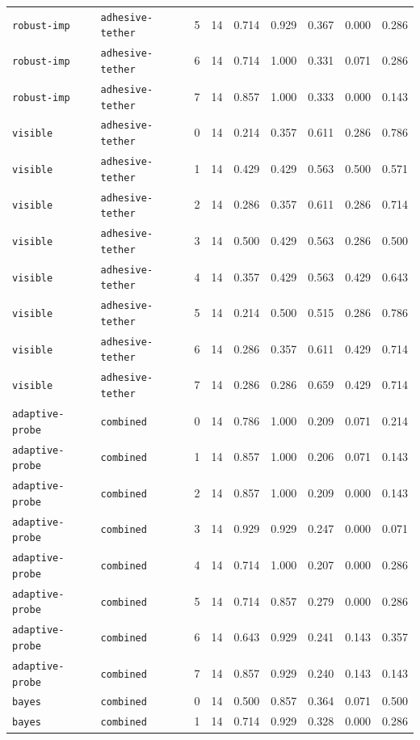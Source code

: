 \documentclass{article}
\begin{document}
\begin{center}
{\begin{tabular}{llllccccc}
\texttt{robust-imp} & \texttt{adhesive-tether} & 5 & 14 & 0.714 & 0.929 & 0.367 & 0.000 & 0.286 \\
\texttt{robust-imp} & \texttt{adhesive-tether} & 6 & 14 & 0.714 & 1.000 & 0.331 & 0.071 & 0.286 \\
\texttt{robust-imp} & \texttt{adhesive-tether} & 7 & 14 & 0.857 & 1.000 & 0.333 & 0.000 & 0.143 \\
\texttt{visible} & \texttt{adhesive-tether} & 0 & 14 & 0.214 & 0.357 & 0.611 & 0.286 & 0.786 \\
\texttt{visible} & \texttt{adhesive-tether} & 1 & 14 & 0.429 & 0.429 & 0.563 & 0.500 & 0.571 \\
\texttt{visible} & \texttt{adhesive-tether} & 2 & 14 & 0.286 & 0.357 & 0.611 & 0.286 & 0.714 \\
\texttt{visible} & \texttt{adhesive-tether} & 3 & 14 & 0.500 & 0.429 & 0.563 & 0.286 & 0.500 \\
\texttt{visible} & \texttt{adhesive-tether} & 4 & 14 & 0.357 & 0.429 & 0.563 & 0.429 & 0.643 \\
\texttt{visible} & \texttt{adhesive-tether} & 5 & 14 & 0.214 & 0.500 & 0.515 & 0.286 & 0.786 \\
\texttt{visible} & \texttt{adhesive-tether} & 6 & 14 & 0.286 & 0.357 & 0.611 & 0.429 & 0.714 \\
\texttt{visible} & \texttt{adhesive-tether} & 7 & 14 & 0.286 & 0.286 & 0.659 & 0.429 & 0.714 \\
\texttt{adaptive-probe} & \texttt{combined} & 0 & 14 & 0.786 & 1.000 & 0.209 & 0.071 & 0.214 \\
\texttt{adaptive-probe} & \texttt{combined} & 1 & 14 & 0.857 & 1.000 & 0.206 & 0.071 & 0.143 \\
\texttt{adaptive-probe} & \texttt{combined} & 2 & 14 & 0.857 & 1.000 & 0.209 & 0.000 & 0.143 \\
\texttt{adaptive-probe} & \texttt{combined} & 3 & 14 & 0.929 & 0.929 & 0.247 & 0.000 & 0.071 \\
\texttt{adaptive-probe} & \texttt{combined} & 4 & 14 & 0.714 & 1.000 & 0.207 & 0.000 & 0.286 \\
\texttt{adaptive-probe} & \texttt{combined} & 5 & 14 & 0.714 & 0.857 & 0.279 & 0.000 & 0.286 \\
\texttt{adaptive-probe} & \texttt{combined} & 6 & 14 & 0.643 & 0.929 & 0.241 & 0.143 & 0.357 \\
\texttt{adaptive-probe} & \texttt{combined} & 7 & 14 & 0.857 & 0.929 & 0.240 & 0.143 & 0.143 \\
\texttt{bayes} & \texttt{combined} & 0 & 14 & 0.500 & 0.857 & 0.364 & 0.071 & 0.500 \\
\texttt{bayes} & \texttt{combined} & 1 & 14 & 0.714 & 0.929 & 0.328 & 0.000 & 0.286 \\
\bottomrule
\end{tabular}%
}
\end{center}
\end{document}
